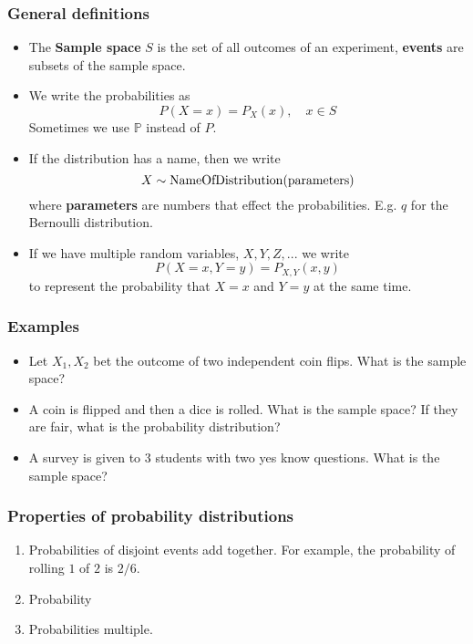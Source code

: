 \begin{frame}
\frametitle{General definitions} 

\begin{itemize}
\item The {\bf Sample space}  $S$ is the set of all outcomes of an experiment, {\bf events} are subsets of the sample space. 
\item We write the probabilities as 
\begin{equation}
P(X = x) = P_X(x),\quad x \in S
\end{equation} 
Sometimes we use ${\mathbb P}$ instead of $P$. 
\item If the distribution has a name, then we write 
\begin{equation}
X \sim {\rm NameOfDistribution}(\text{parameters})
\end{equation}
 where {\bf parameters} are numbers that effect the probabilities. E.g. $q$ for the Bernoulli distribution. 
 \item If we have multiple random variables, $X,Y,Z,...$ we write 
 \begin{equation}
 P(X=x,Y=y) = P_{X,Y}(x,y)
 \end{equation}
  to represent the probability that $X=x$ and $Y=y$ at the same time. 
\end{itemize}

\end{frame}





\begin{frame}
\frametitle{Examples}
\begin{itemize}
\item Let $X_1,X_2$ bet the outcome of two independent coin flips. What is the sample space? 
\item A coin is flipped and then a dice is rolled. What is the sample space? If they are fair, what is the probability distribution? 
\item A survey is given to 3 students with two yes know questions. What is the sample space? 
\end{itemize}
\end{frame}


\begin{frame}
\frametitle{Properties of probability distributions}
\begin{enumerate}
\item Probabilities of disjoint events add together. For example, the probability of rolling $1$ of $2$ is $2/6$. 
\item Probability
\item Probabilities multiple. 
\end{enumerate}
\end{frame}

